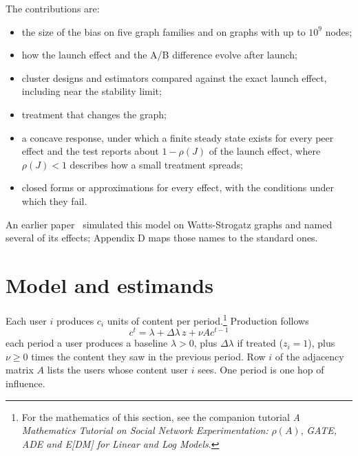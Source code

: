 \documentclass[final,5p,times,twocolumn,number]{elsarticle}
\begin{document}
\begin{table}[!tp]
\vspace{4pt}
\caption{The five graph families, with $N = 10^5$  users and $\bar k = 20$  friends on average. The drawings are small examples with 300 users; node size grows with the number of friends. The numbers in parentheses are the share of a user's friends who are friends of each other (clustered), the share of friendships inside clusters of 1,000 users (communities), and the standard deviation of the number of friends over its mean (heavy-tailed). $\rho(A)$  is the largest eigenvalue of the adjacency matrix, which sets the stability limit $\nu\rho < 1$. Watts-Strogatz graphs have no communities by construction, but contiguous stretches of the ring keep most friendships inside clusters (Section 6.1).}\label{tab:families}
\end{table}


The contributions are:


\begin{itemize}
\item the size of the bias on five graph families and on graphs with up to $10^9$  nodes;
\item how the launch effect and the A/B difference evolve after launch;
\item cluster designs and estimators compared against the exact launch effect, including near the stability limit;
\item treatment that changes the graph;
\item a concave response, under which a finite steady state exists for every peer effect and the test reports about $1 - \rho(J)$  of the launch effect, where $\rho(J) < 1$  describes how a small treatment spreads;
\item closed forms or approximations for every effect, with the conditions under which they fail.
\end{itemize}

An earlier paper~\cite{r20} simulated this model on Watts-Strogatz graphs and named several of its effects; Appendix D maps those names to the standard ones.


\section{Model and estimands}

Each user $i$  produces $c_i$  units of content per period.\footnote{For the mathematics of this section, see the companion tutorial \emph{A Mathematics Tutorial on Social Network Experimentation:} $\rho(A)$, \emph{GATE, ADE and E[DM] for Linear and Log Models}.} Production follows
\begin{equation}c^t = \lambda + \Delta\lambda\,z + \nu A c^{t-1}\label{eq:model}\end{equation}
each period a user produces a baseline $\lambda > 0$, plus $\Delta\lambda$  if treated ($z_i = 1$), plus $\nu \geq 0$  times the content they saw in the previous period. Row $i$  of the adjacency matrix $A$  lists the users whose content user $i$  sees. One period is one hop of influence.
\end{document}
